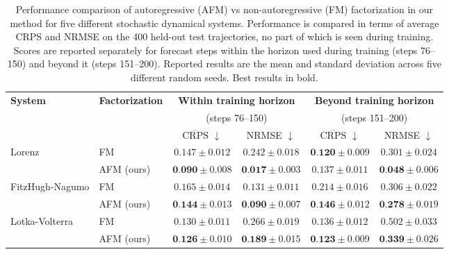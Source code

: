 \documentclass[preprint,12pt,authoryear]{elsarticle}
\newcommand{\oldrev}[1]{#1}
\newcommand{\rev}[1]{#1}
\newcommand{\rev}[1]{\textcolor{blue}{#1}}
\begin{document}
\begin{table}[!ht]
    \centering
    \caption{Performance comparison of autoregressive (AFM) vs non-autoregressive (FM) factorization in our method for five different stochastic dynamical systems. Performance is compared in terms of average CRPS and NRMSE on the \rev{400 held-out test trajectories, no part of which is seen during training. Scores are reported separately for forecast steps within the horizon used during training (steps 76--150) and beyond it (steps 151--200).}
    Reported results are the mean and standard deviation across five different random seeds. \oldrev{Best results in bold.}}
    \renewcommand{\arraystretch}{1.2}
    \setlength{\tabcolsep}{6pt}
    \begin{adjustbox}{max width=\textwidth}
    \begin{tabular}{l l cc cc}
        \toprule
        \multirow{3}{*}{\textbf{System}} & \multirow{3}{*}{\textbf{Factorization}} & 
        \multicolumn{2}{c}{\rev{\textbf{Within training horizon}}} & \multicolumn{2}{c}{\rev{\textbf{Beyond training horizon}}} \\
        & & \multicolumn{2}{c}{\rev{(steps 76--150)}} & \multicolumn{2}{c}{\rev{(steps 151--200)}} \\
        \cmidrule(lr){3-4} \cmidrule(lr){5-6}
        & & $\overline{\text{CRPS}}$ \(\downarrow\) & NRMSE \(\downarrow\) & $\overline{\text{CRPS}}$ \(\downarrow\) & NRMSE \(\downarrow\) \\
        \midrule
        \multirow{2}{*}{Lorenz} 
            & FM   & $0.147 \pm 0.012$ & $0.242 \pm 0.018$ & $\textbf{0.120} \pm 0.009$ & $0.301 \pm 0.024$ \\
            & AFM \oldrev{(ours)} & $\textbf{0.090} \pm 0.008$ & $\textbf{0.017} \pm 0.003$ & $0.137 \pm 0.011$ & $\textbf{0.048} \pm 0.006$ \\
        \midrule
        \multirow{2}{*}{FitzHugh-Nagumo} 
            & FM  & $0.165 \pm 0.014$ & $0.131 \pm 0.011$ &  $0.214 \pm 0.016$ & $0.306 \pm 0.022$ \\
            & AFM \oldrev{(ours)} & $\textbf{0.144} \pm 0.013$ & $\textbf{0.090} \pm 0.007$ & $\textbf{0.146} \pm 0.012$ & $\textbf{0.278} \pm 0.019$ \\
        \midrule
        \multirow{2}{*}{Lotka-Volterra} 
            & FM  & $0.130 \pm 0.011$ & $0.266 \pm 0.019$ & $0.136 \pm 0.012$ & $0.502 \pm 0.033$ \\
            & AFM \oldrev{(ours)} & $\textbf{0.126} \pm 0.010$ & $\textbf{0.189} \pm 0.015$ & $\textbf{0.123} \pm 0.009$ & $\textbf{0.339} \pm 0.026$ \\

\end{tabular}
\end{adjustbox}
\end{table}
\end{document}

